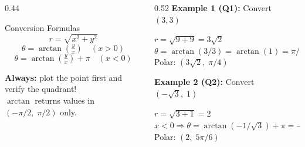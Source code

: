 \documentclass[aspectratio=169, 11pt]{beamer}
\begin{document}
\begin{frame}[t, plain]

  \begin{columns}[T]
    \begin{column}{0.44\textwidth}
      \begin{block}{Conversion Formulas}
        \[ r = \sqrt{x^2 + y^2} \]
        \[ \theta = \arctan\!\left(\tfrac{y}{x}\right) \quad (x > 0) \]
        \[ \theta = \arctan\!\left(\tfrac{y}{x}\right) + \pi \quad (x < 0) \]
      \end{block}

      \vspace{0.2cm}
      \textbf{Always:} plot the point first and verify the quadrant!\\
      $\arctan$ returns values in $(-\pi/2,\; \pi/2)$ only.
    \end{column}

    \begin{column}{0.52\textwidth}
      \textbf{Example 1 (Q1):} Convert $(3,3)$

      \vspace{0.15cm}
      $r = \sqrt{9+9} = 3\sqrt{2}$\\[4pt]
      $\theta = \arctan(3/3) = \arctan(1) = \pi/4$\\[4pt]
      Polar: $(3\sqrt{2},\; \pi/4)$

      \vspace{0.35cm}
      \textbf{Example 2 (Q2):} Convert $(-\sqrt{3},\; 1)$

      \vspace{0.15cm}
      $r = \sqrt{3+1} = 2$\\[4pt]
      $x < 0 \Rightarrow \theta = \arctan(-1/\sqrt{3}) + \pi = -\pi/6 + \pi = 5\pi/6$\\[4pt]
      Polar: $(2,\; 5\pi/6)$
    \end{column}
  \end{columns}
\end{frame}
\end{document}
